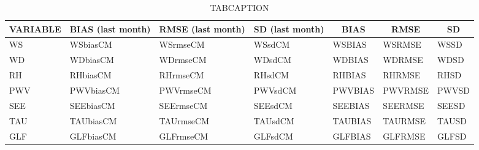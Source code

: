 \begin{table}[]
\begin{center}
\begin{tabular}{|l|l|l|l|l|l|l|}
\hline
\multicolumn{1}{|c|}{\cellcolor[HTML]{C0C0C0}\textbf{VARIABLE}} & \multicolumn{1}{c|}{\cellcolor[HTML]{C0C0C0}\textbf{BIAS} (last month)} & \multicolumn{1}{c|}{\cellcolor[HTML]{C0C0C0}\textbf{RMSE} (last month)} & \multicolumn{1}{c|}{\cellcolor[HTML]{C0C0C0}\textbf{SD} (last month)} & \multicolumn{1}{c|}{\cellcolor[HTML]{C0C0C0}\textbf{BIAS}} & \multicolumn{1}{c|}{\cellcolor[HTML]{C0C0C0}\textbf{RMSE}} & \multicolumn{1}{c|}{\cellcolor[HTML]{C0C0C0}\textbf{SD}}\\\hline
\cellcolor[HTML]{C0C0C0}WS  & WSbiasCM     & WSrmseCM     & WSsdCM  & WSBIAS  & WSRMSE  & WSSD \\
\cellcolor[HTML]{C0C0C0}WD  & WDbiasCM     & WDrmseCM     & WDsdCM  & WDBIAS  & WDRMSE  & WDSD \\
\cellcolor[HTML]{C0C0C0}RH  & RHbiasCM     & RHrmseCM     & RHsdCM  & RHBIAS  & RHRMSE  & RHSD \\
\cellcolor[HTML]{C0C0C0}PWV & PWVbiasCM    & PWVrmseCM    & PWVsdCM & PWVBIAS & PWVRMSE & PWVSD \\
\cellcolor[HTML]{C0C0C0}SEE & SEEbiasCM    & SEErmseCM    & SEEsdCM & SEEBIAS & SEERMSE & SEESD \\
\cellcolor[HTML]{C0C0C0}TAU & TAUbiasCM    & TAUrmseCM    & TAUsdCM & TAUBIAS & TAURMSE & TAUSD \\
\cellcolor[HTML]{C0C0C0}GLF & GLFbiasCM    & GLFrmseCM    & GLFsdCM & GLFBIAS & GLFRMSE & GLFSD \\
\hline
\end{tabular}
\caption{TABCAPTION}
\end{center}
\end{table}
